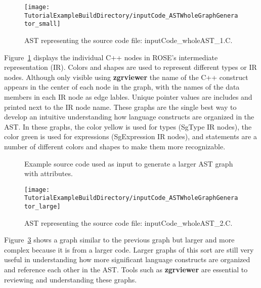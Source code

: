 \begin{figure}
\texttt{[image: \\TutorialExampleBuildDirectory/inputCode\_ASTWholeGraphGenerator\_small]}
\caption{AST representing the source code file: inputCode\_wholeAST\_1.C.}
\label{tutorial:exampleOutputCodeWholeGraph_small}
\end{figure}

   Figure~\ref{tutorial:exampleOutputCodeWholeGraph_small} displays the individual
C++ nodes in ROSE's intermediate representation (IR).  Colors and shapes are used to 
represent different types or IR nodes. Although only visible using {\bf zgrviewer} 
the name of the C++ construct appears in the center of each node in the graph, with 
the names of the data members in each IR node as edge lables. Unique pointer values
are includes and printed next to the IR node name.  These graphs are the single best
way to develop an intuitive understanding how language constructs are organized
in the AST.  In these graphs, the color yellow is used for types (SgType IR nodes),
the color green is used for expressions (SgExpression IR nodes), and statements
are a number of different colors and shapes to make them more recognizable.


\begin{figure}[!h]
{\indent
{\mySmallFontSize

\begin{latexonly}
   
\end{latexonly}

\begin{htmlonly}
   
\end{htmlonly}

}
}
\caption{Example source code used as input to generate a larger AST graph with attributes.}
\label{Tutorial:exampleInputCode_ASTGraphGenerator_large}
\end{figure}

\begin{figure}
\texttt{[image: \\TutorialExampleBuildDirectory/inputCode\_ASTWholeGraphGenerator\_large]}
\caption{AST representing the source code file: inputCode\_wholeAST\_2.C.}
\label{tutorial:exampleOutputCodeWholeGraph_large}
\end{figure}

   Figure~\ref{tutorial:exampleOutputCodeWholeGraph_large} shows a graph similar to the
previous graph but larger and more complex because it is from a larger code. Larger
graphs of this sort are still very useful in understanding how more significant
language constructs are organized and reference each other in the AST.  Tools
such as {\bf zgrviewer} are essential to reviewing and understanding these
graphs.

